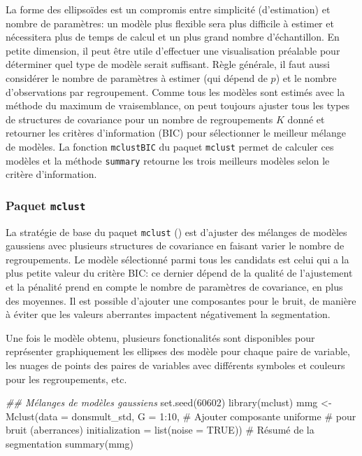 \documentclass[
  11pt,
  letterpaper,
]{scrbook}
\newenvironment{Shaded}{\begin{snugshade}}{\end{snugshade}}
\newcommand{\AttributeTok}[1]{\textcolor[rgb]{0.40,0.45,0.13}{#1}}
\newcommand{\CommentTok}[1]{\textcolor[rgb]{0.37,0.37,0.37}{#1}}
\newcommand{\ConstantTok}[1]{\textcolor[rgb]{0.56,0.35,0.01}{#1}}
\newcommand{\DecValTok}[1]{\textcolor[rgb]{0.68,0.00,0.00}{#1}}
\newcommand{\DocumentationTok}[1]{\textcolor[rgb]{0.37,0.37,0.37}{\textit{#1}}}
\newcommand{\FunctionTok}[1]{\textcolor[rgb]{0.28,0.35,0.67}{#1}}
\newcommand{\NormalTok}[1]{\textcolor[rgb]{0.00,0.23,0.31}{#1}}
\newcommand{\OtherTok}[1]{\textcolor[rgb]{0.00,0.23,0.31}{#1}}
\newcommand{\SpecialCharTok}[1]{\textcolor[rgb]{0.37,0.37,0.37}{#1}}
\theoremstyle{definition}
\theoremstyle{remark}
\begin{document}
La forme des ellipsoïdes est un compromis entre simplicité
(d'estimation) et nombre de paramètres: un modèle plus flexible sera
plus difficile à estimer et nécessitera plus de temps de calcul et un
plus grand nombre d'échantillon. En petite dimension, il peut être utile
d'effectuer une visualisation préalable pour déterminer quel type de
modèle serait suffisant. Règle générale, il faut aussi considérer le
nombre de paramètres à estimer (qui dépend de \(p\)) et le nombre
d'observations par regroupement. Comme tous les modèles sont estimés
avec la méthode du maximum de vraisemblance, on peut toujours ajuster
tous les types de structures de covariance pour un nombre de
regroupements \(K\) donné et retourner les critères d'information (BIC)
pour sélectionner le meilleur mélange de modèles. La fonction
\texttt{mclustBIC} du paquet \texttt{mclust} permet de calculer ces
modèles et la méthode \texttt{summary} retourne les trois meilleurs
modèles selon le critère d'information.

\subsubsection{\texorpdfstring{Paquet
\texttt{mclust}}{Paquet mclust}}\label{paquet-mclust}

La stratégie de base du paquet \texttt{mclust}
() est d'ajuster des mélanges
de modèles gaussiens avec plusieurs structures de covariance en faisant
varier le nombre de regroupements. Le modèle sélectionné parmi tous les
candidats est celui qui a la plus petite valeur du critère BIC: ce
dernier dépend de la qualité de l'ajustement et la pénalité prend en
compte le nombre de paramètres de covariance, en plus des moyennes. Il
est possible d'ajouter une composantes pour le bruit, de manière à
éviter que les valeurs aberrantes impactent négativement la
segmentation.

Une fois le modèle obtenu, plusieurs fonctionalités sont disponibles
pour représenter graphiquement les ellipses des modèle pour chaque paire
de variable, les nuages de points des paires de variables avec
différents symboles et couleurs pour les regroupements, etc.

\begin{Shaded}
\begin{Highlighting}[]
\DocumentationTok{\#\# Mélanges de modèles gaussiens}
\FunctionTok{set.seed}\NormalTok{(}\DecValTok{60602}\NormalTok{)}
\FunctionTok{library}\NormalTok{(mclust)}
\NormalTok{mmg }\OtherTok{\textless{}{-}} \FunctionTok{Mclust}\NormalTok{(}\AttributeTok{data =}\NormalTok{ donsmult\_std,}
       \AttributeTok{G =} \DecValTok{1}\SpecialCharTok{:}\DecValTok{10}\NormalTok{,}
       \CommentTok{\# Ajouter composante uniforme}
       \CommentTok{\#  pour bruit (aberrances)}
       \AttributeTok{initialization =} \FunctionTok{list}\NormalTok{(}\AttributeTok{noise =} \ConstantTok{TRUE}\NormalTok{))}
\CommentTok{\# Résumé de la segmentation}
\FunctionTok{summary}\NormalTok{(mmg)}
\end{Highlighting}
\end{Shaded}
\end{document}
